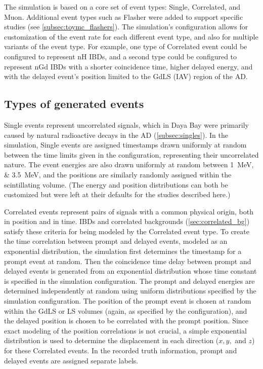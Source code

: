 The simulation is based on a core set of event types:
Single, Correlated, and Muon.
Additional event types such as Flasher were added to support specific studies
(see \cref{subsec:toymc_flashers}).
The simulation's configuration allows for customization of the event rate
for each different event type,
and also for multiple variants of the event type.
For example, one type of Correlated event could be configured to represent nH IBDs,
and a second type could be configured to represent nGd IBDs
with a shorter coincidence time, higher delayed energy,
and with the delayed event's position limited to the GdLS (IAV) region of the AD.

\subsection{Types of generated events}

Single events represent uncorrelated signals,
which in Daya Bay were primarily caused by natural radioactive decays in the AD
(\cref{subsec:singles}).
In the simulation, Single events are assigned timestamps
drawn uniformly at random between the time limits given in the configuration,
representing their uncorrelated nature.
The event energies are also drawn uniformly at random
between \SIlist{1;3.5}{\MeV},
and the positions are similarly randomly assigned
within the scintillating volume.
(The energy and position distributions can both be customized
but were left at their defaults for the studies described here.)

Correlated events represent pairs of signals
with a common physical origin, both in position and in time.
IBDs and correlated backgrounds (\cref{sec:correlated_bg})
satisfy these criteria for being modeled by the Correlated event type.
To create the time correlation between prompt and delayed events,
modeled as an exponential distribution,
the simulation first determines the timestamp for a prompt event at random.
Then the coincidence time delay between prompt and delayed events is generated
from an exponential distribution
whose time constant is specified in the simulation configuration.
The prompt and delayed energies are determined independently at random
using uniform distributions specified by the simulation configuration.
The position of the prompt event is chosen at random
within the GdLS or LS volumes (again, as specified by the configuration),
and the delayed position is chosen to be correlated with the prompt position.
Since exact modeling of the position correlations is not crucial,
a simple exponential distribution is used to determine the displacement
in each direction ($x,y,$ and $z$) for these Correlated events.
In the recorded truth information,
prompt and delayed events are assigned separate labels.

